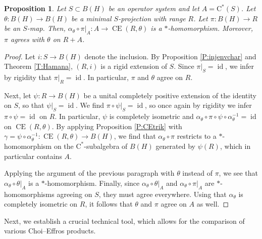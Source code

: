 \documentclass[10pt]{amsart}
\newcommand{\rC}{\mathrm{C}}
\newcommand{\CE}{\operatorname{CE}}
\newcommand{\id}{\operatorname{id}}
\newtheorem{proposition}[lemma]{Proposition}
\theoremstyle{definition}
\begin{document}
\begin{proposition}\label{P:minuep}
Let $S\subset B(H)$ be an operator system and let $A=\rC^*(S)$.  Let $\theta:B(H)\to B(H)$ be a minimal $S$-projection with range $R$. Let $\pi:B(H)\to R$ be an $S$-map. Then, $\alpha_\theta\circ \pi|_{A}:A\to \CE(R,\theta)$ is a $*$-homomorphism. Moreover, $\pi$ agrees with $\theta$ on $R+A$.
\end{proposition}
\begin{proof}
Let $i:S\to B(H)$ denote the inclusion. By Proposition \ref{P:injenvchar} and Theorem \ref{T:Hamana}, $(R,i )$ is a rigid extension of $S$. Since $\pi|_S=\id$, we infer by rigidity that $\pi|_R=\id$. In particular, $\pi$ and $\theta$ agree on $R$.

Next, let $\psi:R\to B(H)$ be a unital completely positive extension of the identity on $S$, so that $\psi|_S=\id$. We find $\pi\circ \psi|_S=\id$, so once again by rigidity we infer $\pi\circ \psi=\id$ on $R$. In particular, $\psi$ is completely isometric and $\alpha_\theta\circ \pi\circ \psi\circ \alpha_\theta^{-1}=\id$ on $\CE(R,\theta)$. By applying Proposition \ref{P:CEtrik} with $\gamma=\psi\circ\alpha_\theta^{-1}:\CE(R,\theta)\to B(H)$, we find that $\alpha_\theta\circ \pi$ restricts to a $*$-homomorphism on the $\rC^*$-subalgebra of $B(H)$ generated by $\psi(R)$, which in particular contains $A$.  

Applying the argument of the previous paragraph with $\theta$ instead of $\pi$,  we see that $\alpha_\theta\circ \theta|_A $ is a $*$-homomorphism. Finally, since  $\alpha_\theta\circ \theta|_A $ and $\alpha_\theta\circ \pi|_A$ are $*$-homomorphisms agreeing on $S$, they must agree everywhere. Using that $\alpha_\theta$ is completely isometric on $R$,  it follows that $\theta$ and $\pi$ agree on $A$ as well.
\end{proof}



Next, we establish a crucial technical tool, which allows for the comparison of various Choi--Effros products.
\end{document}
